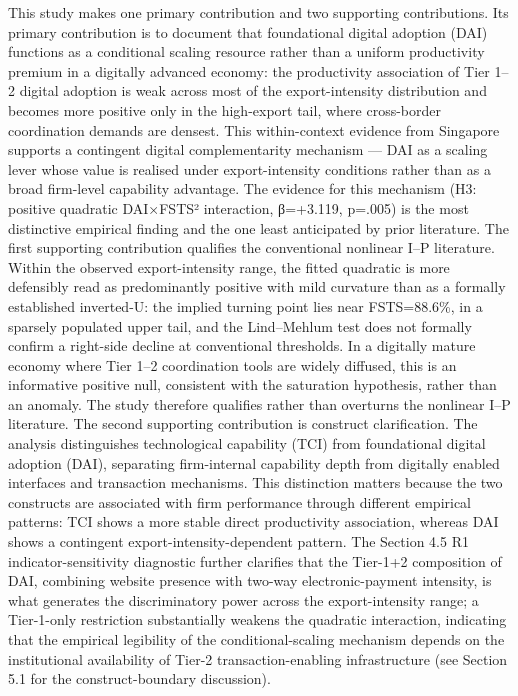 \documentclass[12pt,a4paper]{article}
\begin{document}
This study makes one primary contribution and two supporting
contributions. Its primary contribution is to document that foundational
digital adoption (DAI) functions as a conditional scaling resource
rather than a uniform productivity premium in a digitally advanced
economy: the productivity association of Tier 1--2 digital adoption is
weak across most of the export-intensity distribution and becomes more
positive only in the high-export tail, where cross-border coordination
demands are densest. This within-context evidence from Singapore
supports a contingent digital complementarity mechanism --- DAI as a
scaling lever whose value is realised under export-intensity conditions
rather than as a broad firm-level capability advantage. The evidence for
this mechanism (H3: positive quadratic DAI×FSTS² interaction, β=+3.119,
p=.005) is the most distinctive empirical finding and the one least
anticipated by prior literature. The first supporting contribution
qualifies the conventional nonlinear I--P literature. Within the
observed export-intensity range, the fitted quadratic is more defensibly
read as predominantly positive with mild curvature than as a formally
established inverted-U: the implied turning point lies near FSTS=88.6\%,
in a sparsely populated upper tail, and the Lind--Mehlum test does not
formally confirm a right-side decline at conventional thresholds. In a
digitally mature economy where Tier 1--2 coordination tools are widely
diffused, this is an informative positive null, consistent with the
saturation hypothesis, rather than an anomaly. The study therefore
qualifies rather than overturns the nonlinear I--P literature. The
second supporting contribution is construct clarification. The analysis
distinguishes technological capability (TCI) from foundational digital
adoption (DAI), separating firm-internal capability depth from digitally
enabled interfaces and transaction mechanisms. This distinction matters
because the two constructs are associated with firm performance through
different empirical patterns: TCI shows a more stable direct
productivity association, whereas DAI shows a contingent
export-intensity-dependent pattern. The Section 4.5 R1
indicator-sensitivity diagnostic further clarifies that the Tier-1+2
composition of DAI, combining website presence with two-way
electronic-payment intensity, is what generates the discriminatory power
across the export-intensity range; a Tier-1-only restriction
substantially weakens the quadratic interaction, indicating that the
empirical legibility of the conditional-scaling mechanism depends on the
institutional availability of Tier-2 transaction-enabling infrastructure
(see Section 5.1 for the construct-boundary discussion).
\end{document}
